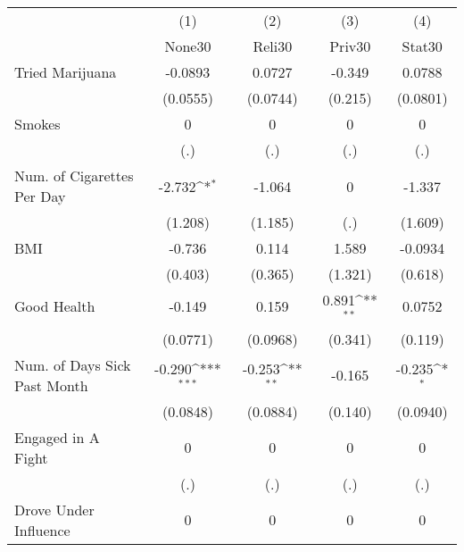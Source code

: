 {
\def\sym#1{\ifmmode^{#1}\else\(^{#1}\)\fi}
\begin{tabular}{l*{4}{c}}
\hline\hline
            &\multicolumn{1}{c}{(1)}&\multicolumn{1}{c}{(2)}&\multicolumn{1}{c}{(3)}&\multicolumn{1}{c}{(4)}\\
            &\multicolumn{1}{c}{None30}&\multicolumn{1}{c}{Reli30}&\multicolumn{1}{c}{Priv30}&\multicolumn{1}{c}{Stat30}\\
\hline
Tried Marijuana&     -0.0893         &      0.0727         &      -0.349         &      0.0788         \\
            &    (0.0555)         &    (0.0744)         &     (0.215)         &    (0.0801)         \\
[1em]
Smokes      &           0         &           0         &           0         &           0         \\
            &         (.)         &         (.)         &         (.)         &         (.)         \\
[1em]
Num. of Cigarettes Per Day&      -2.732\sym{*}  &      -1.064         &           0         &      -1.337         \\
            &     (1.208)         &     (1.185)         &         (.)         &     (1.609)         \\
[1em]
BMI         &      -0.736         &       0.114         &       1.589         &     -0.0934         \\
            &     (0.403)         &     (0.365)         &     (1.321)         &     (0.618)         \\
[1em]
Good Health &      -0.149         &       0.159         &       0.891\sym{**} &      0.0752         \\
            &    (0.0771)         &    (0.0968)         &     (0.341)         &     (0.119)         \\
[1em]
Num. of Days Sick Past Month&      -0.290\sym{***}&      -0.253\sym{**} &      -0.165         &      -0.235\sym{*}  \\
            &    (0.0848)         &    (0.0884)         &     (0.140)         &    (0.0940)         \\
[1em]
Engaged in A Fight&           0         &           0         &           0         &           0         \\
            &         (.)         &         (.)         &         (.)         &         (.)         \\
[1em]
Drove Under Influence&           0         &           0         &           0         &           0         \\

\end{tabular}}
